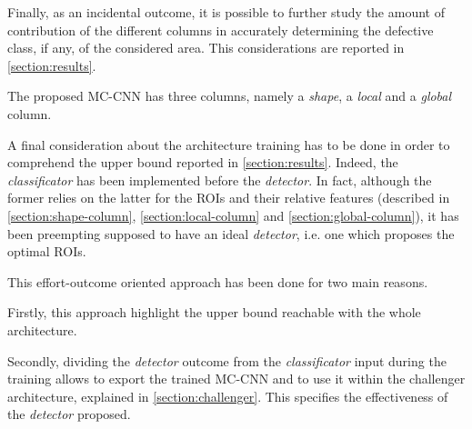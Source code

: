     \par{
        Finally, as an incidental outcome, it is possible to further study the amount of contribution of the different columns in accurately determining the defective class, if any, of the considered area. This considerations are reported in \ref{section:results}.
    }
    \par{
        The proposed MC-CNN has three columns, namely a \emph{shape}, a \emph{local} and a \emph{global} column.
    }
    \par{
        A final consideration about the architecture training has to be done in order to comprehend the upper bound reported in \ref{section:results}. Indeed, the \emph{classificator} has been implemented before the \emph{detector}. In fact, although the former relies on the latter for the ROIs and their relative features (described in \ref{section:shape-column}, \ref{section:local-column} and \ref{section:global-column}), it has been preempting supposed to have an ideal \emph{detector}, i.e. one which proposes the optimal ROIs.
    }
    \par{
        This effort-outcome oriented approach has been done for two main reasons.
    }
    \par{
        Firstly, this approach highlight the upper bound reachable with the whole architecture.
    }
    \par{
        Secondly, dividing the \emph{detector} outcome from the \emph{classificator} input during the training allows to export the trained MC-CNN and to use it within the challenger architecture, explained in \ref{section:challenger}. This specifies the effectiveness of the \emph{detector} proposed.
    }
